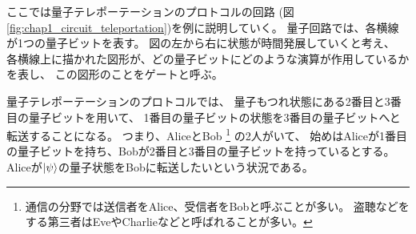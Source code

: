 \documentclass[../master.tex]{subfiles}
\begin{document}
ここでは量子テレポーテーションのプロトコルの回路
(図\ref{fig:chap1_circuit_teleportation})を例に説明していく。
量子回路では、各横線が1つの量子ビットを表す。
図の左から右に状態が時間発展していくと考え、
各横線上に描かれた図形が、どの量子ビットにどのような演算が作用しているかを表し、
この図形のことをゲートと呼ぶ。

量子テレポーテーションのプロトコルでは、
量子もつれ状態にある2番目と3番目の量子ビットを用いて、
1番目の量子ビットの状態を3番目の量子ビットへと転送することになる。
つまり、AliceとBob
\footnote{通信の分野では送信者をAlice、受信者をBobと呼ぶことが多い。
盗聴などをする第三者はEveやCharlieなどと呼ばれることが多い。}
の2人がいて、
始めはAliceが1番目の量子ビットを持ち、Bobが2番目と3番目の量子ビットを持っているとする。
Aliceが\(\ket{\psi}\)の量子状態をBobに転送したいという状況である。
\end{document}
